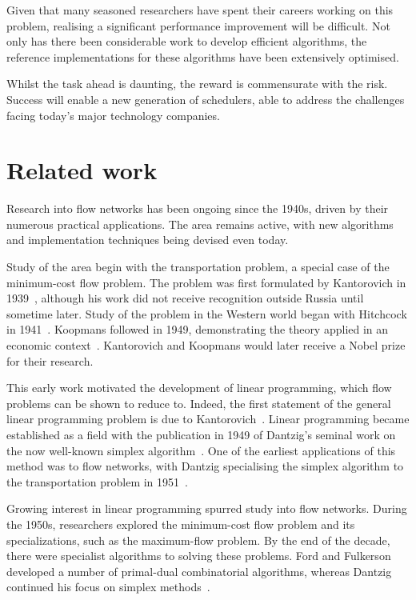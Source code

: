 Given that many seasoned researchers have spent their careers working on this problem, realising a significant performance improvement will be difficult. Not only has there been considerable work to develop efficient algorithms, the reference implementations for these algorithms have been extensively optimised.

Whilst the task ahead is daunting, the reward is commensurate with the risk. Success will enable a new generation of schedulers, able to address the challenges facing today's major technology companies.

\section{Related work} \label{sec:intro-related-work}

Research into flow networks has been ongoing since the 1940s, driven by their numerous practical applications. The area remains active, with new algorithms and implementation techniques being devised even today.

Study of the area begin with the transportation problem, a special case of the minimum-cost flow problem. The problem was first formulated by Kantorovich in 1939~\cite{Kantorovich:1960}, although his work did not receive recognition outside Russia until sometime later. Study of the problem in the Western world began with Hitchcock in 1941~\cite{Hitchcock:1941}. Koopmans followed in 1949, demonstrating the theory applied in an economic context~\cite{Koopmans:1949}. Kantorovich and Koopmans would later receive a Nobel prize for their research\footnotemark.

This early work motivated the development of linear programming, which flow problems can be shown to reduce to. Indeed, the first statement of the general linear programming problem is due to Kantorovich~\cite{Kantorovich:1960}. Linear programming became established  as a field with the publication in 1949 of Dantzig's seminal work on the now well-known simplex algorithm~\cite{Dantzig:1949}. One of the earliest applications of this method was to flow networks, with Dantzig specialising the simplex algorithm to the transportation problem in 1951~\cite{Dantzig:1951}.

Growing interest in linear programming spurred study into flow networks. During the 1950s, researchers explored the minimum-cost flow problem and its specializations, such as the maximum-flow problem. By the end of the decade, there were specialist algorithms to solving these problems. Ford and Fulkerson developed a number of primal-dual combinatorial algorithms, whereas Dantzig continued his focus on simplex methods~\cite{FordFulkerson:1962,Dantzig:1962}.


